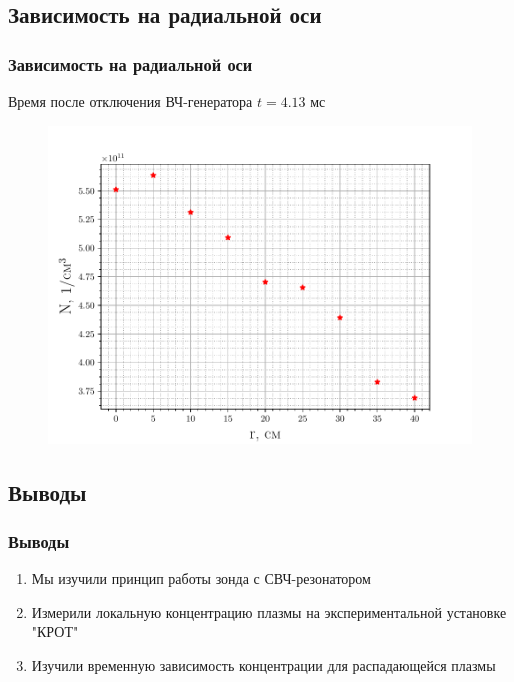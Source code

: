\documentclass[10pt,pdf,hyperref={unicode}, dvipsnames]{beamer}
\begin{document}
\subsection{Зависимость на радиальной оси}
\begin{frame}
	\frametitle{Зависимость на радиальной оси}
	Время после отключения ВЧ-генератора $t=4.13$ мс
	\begin{figure}[tb]
		\centering
		\includegraphics[width=0.9\linewidth]{fig/radial}
		\label{fig:2}
	\end{figure}
\end{frame}

\subsection{Выводы}
\begin{frame}
		\vfill
		\frametitle{Выводы}
		\begin{enumerate}
			\item Мы изучили принцип работы зонда с СВЧ-резонатором

			\item Измерили локальную концентрацию плазмы на экспериментальной установке "КРОТ"

			\item Изучили временную зависимость концентрации для распадающейся плазмы  

		\end{enumerate}
		\vfill
\end{frame}
\end{document}
